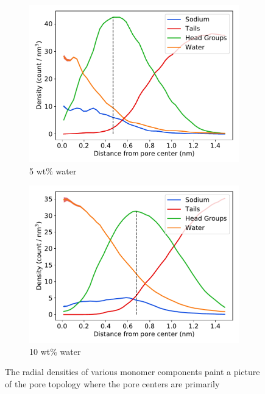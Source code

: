 \documentclass{article}
\begin{document}
  \begin{figure}
  \centering
  \begin{subfigure}{0.49\linewidth}
  \includegraphics[width=\linewidth]{component_density_5wt.pdf}
  \caption{5 wt\% water}\label{fig:component_density_5wt}
  \end{subfigure}
  \begin{subfigure}{0.49\linewidth}
  \includegraphics[width=\linewidth]{component_density_10wt.pdf}
  \caption{10 wt\% water}\label{fig:component_density_10wt}
  \end{subfigure}
  \caption{The radial densities of various monomer components paint a
  picture of the pore topology where the pore centers are primarily 
}
\end{figure}
\end{document}
